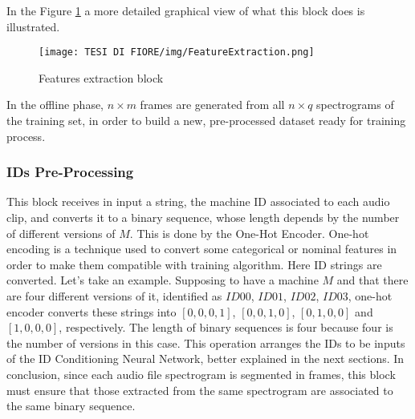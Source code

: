 In the Figure \ref{features-extraction} a more detailed graphical view of what this block does is illustrated.
\begin{figure}[ht]
\texttt{[image: TESI DI FIORE/img/FeatureExtraction.png]}
\centering
\caption{Features extraction block}
\label{features-extraction}
\end{figure}
In the offline phase, $n \times m$ frames are generated from all $n \times q$ spectrograms of the training set, in order to build a new, pre-processed dataset ready for training process.
\subsubsection{IDs Pre-Processing}
This block receives in input a string, the machine ID associated to each audio clip, and converts it to a binary sequence, whose length depends by the number of different versions of $M$. This is done by the One-Hot Encoder. One-hot encoding is a technique used to convert some categorical or nominal features in order to make them compatible with training algorithm. Here ID strings are converted. Let's take an example. Supposing to have a machine $M$ and that there are four different versions of it, identified as $ID00$, $ID01$, $ID02$, $ID03$, one-hot encoder converts these strings into $[0,0,0,1]$, $[0,0,1,0]$, $[0,1,0,0]$ and $[1,0,0,0]$, respectively. The length of binary sequences is four because four is the number of versions in this case. This operation arranges the IDs to be inputs of the ID Conditioning Neural Network, better explained in the next sections. In conclusion, since each audio file spectrogram is segmented in frames, this block must ensure that those extracted from the same spectrogram are associated to the same binary sequence.

